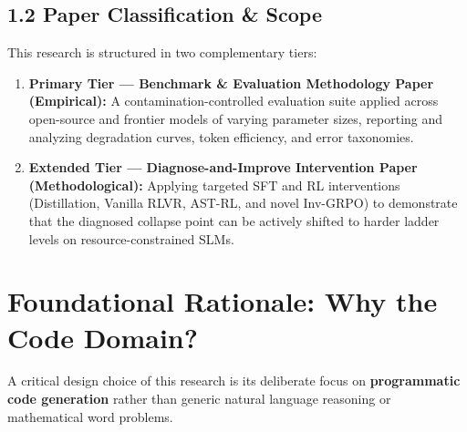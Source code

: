 \documentclass[12pt, a4paper]{article}
\begin{document}
\subsection{1.2 Paper Classification \& Scope}

This research is structured in two complementary tiers:
\begin{enumerate}[leftmargin=1.5em]
  \item \textbf{Primary Tier --- Benchmark \& Evaluation Methodology Paper (Empirical):} A contamination-controlled evaluation suite applied across open-source and frontier models of varying parameter sizes, reporting and analyzing degradation curves, token efficiency, and error taxonomies.
  \item \textbf{Extended Tier --- Diagnose-and-Improve Intervention Paper (Methodological):} Applying targeted SFT and RL interventions (Distillation, Vanilla RLVR, AST-RL, and novel Inv-GRPO) to demonstrate that the diagnosed collapse point can be actively shifted to harder ladder levels on resource-constrained SLMs.
\end{enumerate}

\section{Foundational Rationale: Why the Code Domain?}

A critical design choice of this research is its deliberate focus on \textbf{programmatic code generation} rather than generic natural language reasoning or mathematical word problems.
\end{document}
